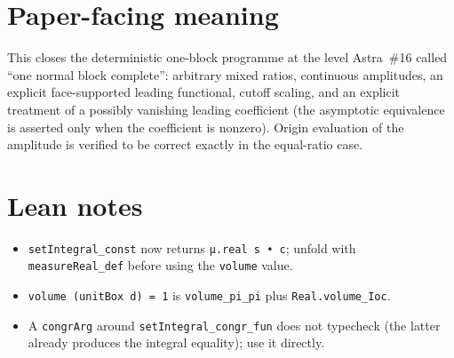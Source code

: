 \documentclass[11pt]{article}
\begin{document}
\section{Paper-facing meaning}
This closes the deterministic one-block programme at the level Astra~\#16 called ``one normal block
complete'': arbitrary mixed ratios, continuous amplitudes, an explicit face-supported leading
functional, cutoff scaling, and an explicit treatment of a possibly vanishing leading coefficient
(the asymptotic equivalence is asserted only when the coefficient is nonzero). Origin evaluation of
the amplitude is verified to be correct exactly in the equal-ratio case.

\section{Lean notes}
\begin{itemize}
\item \texttt{setIntegral\_const} now returns \texttt{μ.real s • c}; unfold with
\texttt{measureReal\_def} before using the \texttt{volume} value.
\item \texttt{volume (unitBox d) = 1} is \texttt{volume\_pi\_pi} plus \texttt{Real.volume\_Ioc}.
\item A \texttt{congrArg} around \texttt{setIntegral\_congr\_fun} does not typecheck (the latter
already produces the integral equality); use it directly.
\end{itemize}
\end{document}
